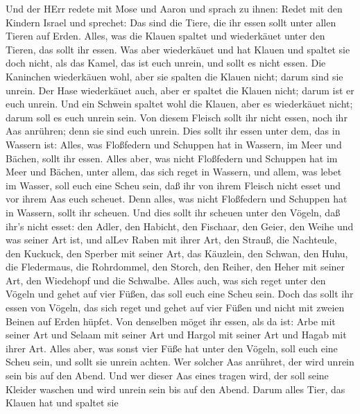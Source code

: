  Und der HErr redete mit Mose und Aaron und sprach zu ihnen:
 Redet mit den Kindern Israel und sprechet: Das sind die
Tiere, die ihr essen sollt unter allen Tieren auf Erden. 
Alles, was die Klauen spaltet und wiederkäuet unter den Tieren, das
sollt ihr essen.  Was aber wiederkäuet und hat Klauen und
spaltet sie doch nicht, als das Kamel, das ist euch unrein, und sollt es
nicht essen.  Die Kaninchen wiederkäuen wohl, aber sie
spalten die Klauen nicht; darum sind sie unrein.  Der Hase
wiederkäuet auch, aber er spaltet die Klauen nicht; darum ist er euch
unrein.  Und ein Schwein spaltet wohl die Klauen, aber es
wiederkäuet nicht; darum soll es euch unrein sein.  Von
diesem Fleisch sollt ihr nicht essen, noch ihr Aas anrühren; denn sie
sind euch unrein.  Dies sollt ihr essen unter dem, das in
Wassern ist: Alles, was Floßfedern und Schuppen hat in Wassern, im Meer
und Bächen, sollt ihr essen.  Alles aber, was nicht
Floßfedern und Schuppen hat im Meer und Bächen, unter allem, das sich
reget in Wassern, und allem, was lebet im Wasser, soll euch eine Scheu
sein,  daß ihr von ihrem Fleisch nicht esset und vor ihrem
Aas euch scheuet.  Denn alles, was nicht Floßfedern und
Schuppen hat in Wassern, sollt ihr scheuen.  Und dies sollt
ihr scheuen unter den Vögeln, daß ihr's nicht esset: den Adler, den
Habicht, den Fischaar,  den Geier, den Weihe und was seiner
Art ist,  und alLev Raben mit ihrer Art,  den
Strauß, die Nachteule, den Kuckuck, den Sperber mit seiner Art,
 das Käuzlein, den Schwan, den Huhu,  die
Fledermaus, die Rohrdommel,  den Storch, den Reiher, den
Heher mit seiner Art, den Wiedehopf und die Schwalbe. 
Alles auch, was sich reget unter den Vögeln und gehet auf vier Füßen,
das soll euch eine Scheu sein.  Doch das sollt ihr essen
von Vögeln, das sich reget und gehet auf vier Füßen und nicht mit zweien
Beinen auf Erden hüpfet.  Von denselben möget ihr essen,
als da ist: Arbe mit seiner Art und Selaam mit seiner Art und Hargol mit
seiner Art und Hagab mit ihrer Art.  Alles aber, was sonst
vier Füße hat unter den Vögeln, soll euch eine Scheu sein, 
und sollt sie unrein achten. Wer solcher Aas anrühret, der wird unrein
sein bis auf den Abend.  Und wer dieser Aas eines tragen
wird, der soll seine Kleider waschen und wird unrein sein bis auf den
Abend.  Darum alles Tier, das Klauen hat und spaltet sie

